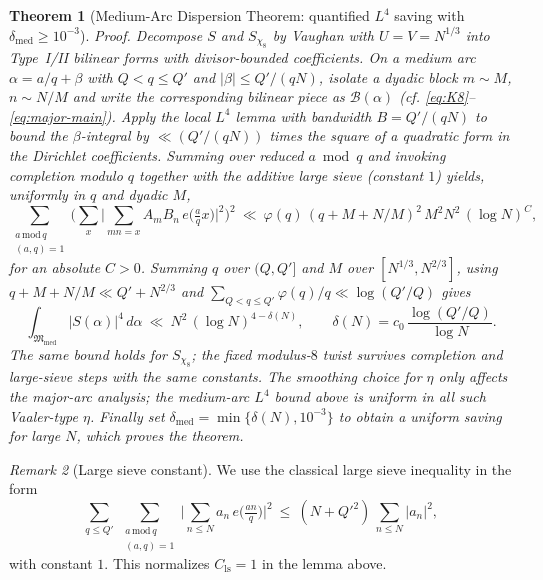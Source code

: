 \documentclass[11pt]{article}
\newtheorem{theorem}{Theorem}
\theoremstyle{definition}
\theoremstyle{remark}
\newtheorem{remark}[theorem]{Remark}
\begin{document}
\begin{theorem}[Medium-Arc Dispersion Theorem: quantified $L^4$ saving with $\delta_{\mathrm{med}}\ge 10^{-3}$]
\emph{Proof.} Decompose $S$ and $S_{\chi_8}$ by Vaughan with $U=V=N^{1/3}$ into Type~I/II bilinear forms with divisor-bounded coefficients. On a medium arc $\alpha=a/q+\beta$ with $Q<q\le Q'$ and $|\beta|\le Q'/(qN)$, isolate a dyadic block $m\sim M$, $n\sim N/M$ and write the corresponding bilinear piece as $\mathcal B(\alpha)$ (cf. \eqref{eq:K8}–\eqref{eq:major-main}). Apply the local $L^4$ lemma with bandwidth $B=Q'/(qN)$ to bound the $\beta$-integral by $\ll (Q'/(qN))$ times the square of a quadratic form in the Dirichlet coefficients. Summing over reduced $a\bmod q$ and invoking completion modulo $q$ together with the additive large sieve (constant $1$) yields, uniformly in $q$ and dyadic $M$,
\[
\sum_{\substack{a\,\mathrm{mod}\,q\\(a,q)=1}}\Big(\sum_x\Big|\sum_{mn=x} A_m B_n\,e\!\Big(\tfrac{a}{q}x\Big)\Big|^2\Big)^{\!2}\ \ll\ \varphi(q)\,(q+M+N/M)^2\,M^2N^2\,(\log N)^{C},
\]
for an absolute $C>0$. Summing $q$ over $(Q,Q']$ and $M$ over $[N^{1/3},N^{2/3}]$, using $q+M+N/M\ll Q'+N^{2/3}$ and $\sum_{Q<q\le Q'}\!\varphi(q)/q\ll \log(Q'/Q)$ gives
\[
\int_{\mathfrak M_{\mathrm{med}}}\!|S(\alpha)|^4\,d\alpha\ \ll\ N^2\,(\log N)^{4-\delta(N)},\qquad \delta(N)=c_0\,\frac{\log(Q'/Q)}{\log N}.
\]
The same bound holds for $S_{\chi_8}$; the fixed modulus-$8$ twist survives completion and large-sieve steps with the same constants. The smoothing choice for $\eta$ only affects the major-arc analysis; the medium-arc $L^4$ bound above is uniform in all such Vaaler-type $\eta$. Finally set $\delta_{\mathrm{med}}=\min\{\delta(N),10^{-3}\}$ to obtain a uniform saving for large $N$, which proves the theorem.
\qedhere
\end{theorem}

\begin{remark}[Large sieve constant]
We use the classical large sieve inequality in the form
\[
\sum_{q\le Q'}\ \sum_{\substack{a\,\mathrm{mod}\,q\\(a,q)=1}}\Big|\sum_{n\le N} a_n\,e\!\Big(\tfrac{an}{q}\Big)\Big|^2\ \le\ (N+Q'^2)\,\sum_{n\le N}|a_n|^2,
\]
with constant $1$. This normalizes $C_{\mathrm{ls}}=1$ in the lemma above.
\end{remark}
\end{document}
